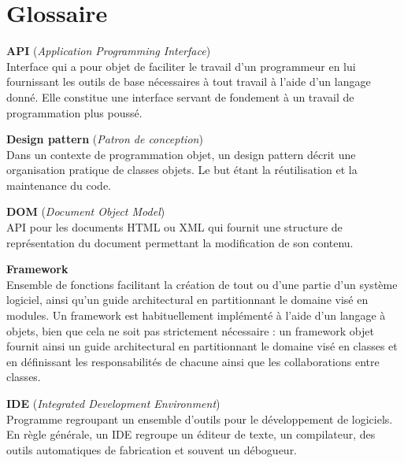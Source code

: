 \chapter*{Glossaire}

\textbf{API} (\textit{Application Programming Interface})\\
Interface qui a pour objet de faciliter le travail d'un programmeur en lui fournissant les outils de base n\'ecessaires \`a tout travail \`a l'aide d'un langage donn\'e.
Elle constitue une interface servant de fondement \`a un travail de programmation plus pouss\'e.

\vspace{0.5cm}

\textbf{Design pattern} (\textit{Patron de conception})\\
Dans un contexte de programmation objet, un design pattern d\'ecrit une organisation pratique de classes objets. 
Le but \'etant la r\'eutilisation et la maintenance du code.

\vspace{0.5cm}

\textbf{DOM} (\textit{Document Object Model})\\
API pour les documents HTML ou XML qui fournit une structure de repr\'esentation du document permettant la modification de son contenu.

\vspace{0.5cm}

\textbf{Framework}\\
Ensemble de fonctions facilitant la cr\'eation de tout ou d'une partie d'un syst\`eme logiciel, ainsi qu'un guide architectural en partitionnant le domaine vis\'e en modules. 
Un framework est habituellement impl\'ement\'e \`a l'aide d'un langage \`a objets, bien que cela ne soit pas strictement n\'ecessaire : un framework objet fournit ainsi un guide architectural en partitionnant le domaine vis\'e en classes et en d\'efinissant les responsabilit\'es de chacune ainsi que les collaborations entre classes. 

\vspace{0.5cm}

\textbf{IDE} (\textit{Integrated Development Environment})\\
Programme regroupant un ensemble d'outils pour le d\'eveloppement de logiciels.
En r\`egle g\'en\'erale, un IDE regroupe un \'editeur de texte, un compilateur, des outils automatiques de fabrication et souvent un d\'ebogueur.

